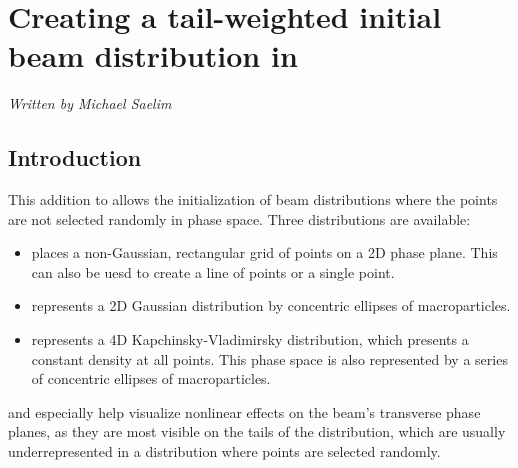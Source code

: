 \section{Creating a tail-weighted initial beam distribution in \bmad}

\textit{Written by Michael Saelim}

\subsection{Introduction}
This addition to \bmad allows the initialization of beam distributions where the points are not selected randomly in phase space.  Three distributions are available: 
\begin{itemize}
\item {} places a non-Gaussian, rectangular grid of points on a 2D phase plane.  This can also be uesd to create a line of points or a single point.  
\item {} represents a 2D Gaussian distribution by concentric ellipses of macroparticles.
\item {} represents a 4D Kapchinsky-Vladimirsky distribution, which presents a constant density at all points.  This phase space is also represented by a series of concentric ellipses of macroparticles.  
\end{itemize}
 and  especially help visualize nonlinear effects on the beam's transverse phase planes, as they are most visible on the tails of the distribution, which are usually underrepresented in a distribution where points are selected randomly.

